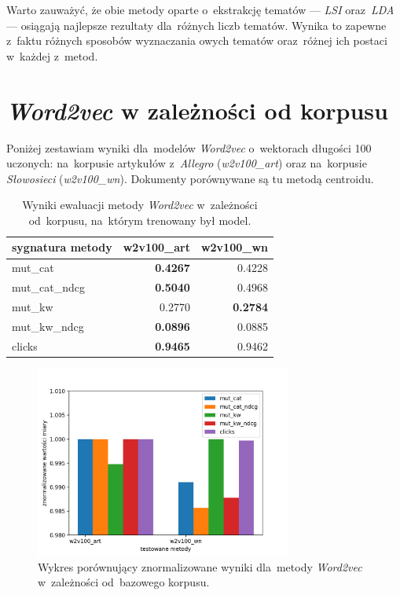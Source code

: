 \documentclass[pl]{minipw} %
\begin{document}
Warto zauważyć, że obie metody oparte o~ekstrakcję tematów --- \textit{LSI} oraz~\textit{LDA} --- osiągają najlepsze rezultaty dla~różnych liczb tematów. Wynika to zapewne z~faktu różnych sposobów wyznaczania owych tematów oraz~różnej ich postaci w~każdej z~metod.


\section{\textit{Word2vec} w zależności od korpusu}

Poniżej zestawiam wyniki dla~modelów \textit{Word2vec} o~wektorach długości 100 uczonych: na~korpusie artykułów z~\textit{Allegro} (\textit{w2v100\_art}) oraz na~korpusie \textit{Słowosieci} (\textit{w2v100\_wn}). Dokumenty porównywane są tu metodą centroidu.

\begin{table}[H]
	\centering
	\begin{tabular}{lrr}
		\hline
		sygnatura metody &   w2v100\_art &   w2v100\_wn \\
		\hline
		mut\_cat      &       \textbf{0.4267} &      0.4228 \\
		mut\_cat\_ndcg &       \textbf{0.5040}  &      0.4968 \\
		mut\_kw       &       0.2770  &      \textbf{0.2784} \\
		mut\_kw\_ndcg  &       \textbf{0.0896} &      0.0885 \\
		clicks       &       \textbf{0.9465} &      0.9462 \\
		\hline
	\end{tabular}
	\caption{Wyniki ewaluacji metody \textit{Word2vec} w~zależności od~korpusu, na~którym trenowany był model.}
\end{table}

\begin{figure}[H]
	\centering
	\includegraphics[width=0.75\textwidth]{img/results/w2v100_art_w2v100_wn_.png}
\caption{Wykres porównujący znormalizowane wyniki dla~metody \textit{Word2vec} w~zależności od~bazowego korpusu.}
\end{figure}
\end{document}

